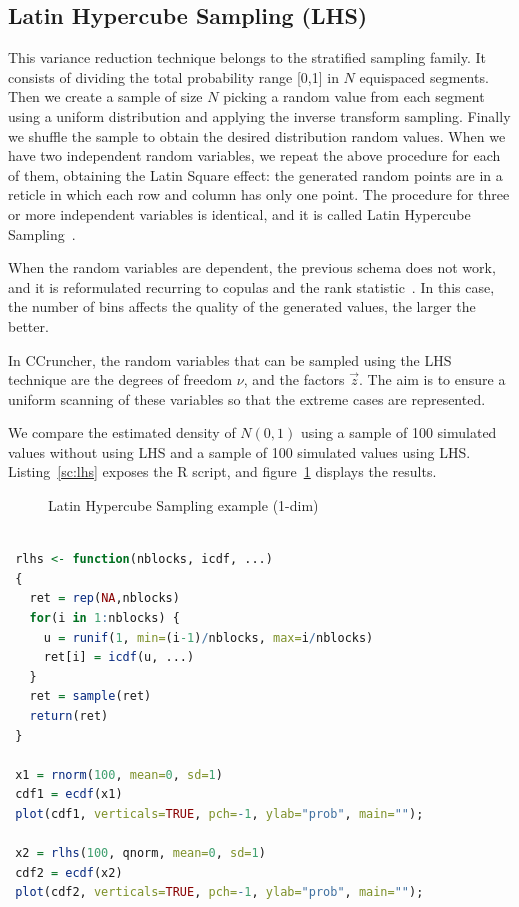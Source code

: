 \documentclass[11pt,fleqn]{book} %
\begin{document}
\subsection{Latin Hypercube Sampling (LHS)}
This variance reduction technique 
belongs to the stratified sampling family. It consists of dividing the total 
probability range [0,1] in $N$ equispaced segments. Then we create a 
sample of size $N$ picking a random value from each segment using a uniform 
distribution and applying the inverse transform sampling. Finally we shuffle 
the sample to obtain the desired distribution random values. When we have 
two independent random variables, we repeat the above procedure for each of 
them, obtaining the Latin Square effect: the generated random points are in
a reticle in which each row and column has only one point. The procedure for
three or more independent variables is identical, and it is called Latin 
Hypercube Sampling~\cite{glasserman:1997}.

When the random variables are dependent, the previous schema does not work, 
and it is reformulated recurring to copulas and the rank statistic~\cite{wolfgang:2008}. 
In this case, the number of bins affects the quality of the generated values, 
the larger the better.

In CCruncher, the random variables that can be sampled using the LHS 
technique are the degrees of freedom $\nu$, and the factors $\vec{z}$. 
The aim is to ensure a uniform scanning of these variables so that the
extreme cases are represented.

\begin{example}
	We compare the estimated density of $N(0,1)$ using a sample of 100 
	simulated values without using LHS and a sample of 100 simulated values 
	using LHS. Listing~\ref{sc:lhs} exposes the R script, and 
	figure~\ref{fig:lhs} displays the results.
\end{example}

\begin{figure}[!ht]
	\centering
	\caption{Latin Hypercube Sampling example (1-dim)}
	\label{fig:lhs} 
\end{figure}

\begin{lstlisting}[language=R, label=sc:lhs, caption=Latin Hypercube Sampling example (R script)]

 rlhs <- function(nblocks, icdf, ...) 
 {
   ret = rep(NA,nblocks)
   for(i in 1:nblocks) {
     u = runif(1, min=(i-1)/nblocks, max=i/nblocks)
     ret[i] = icdf(u, ...)
   }
   ret = sample(ret)
   return(ret)
 }

 x1 = rnorm(100, mean=0, sd=1)
 cdf1 = ecdf(x1)
 plot(cdf1, verticals=TRUE, pch=-1, ylab="prob", main="");
 
 x2 = rlhs(100, qnorm, mean=0, sd=1)
 cdf2 = ecdf(x2)
 plot(cdf2, verticals=TRUE, pch=-1, ylab="prob", main="");
 
\end{lstlisting}
\end{document}
